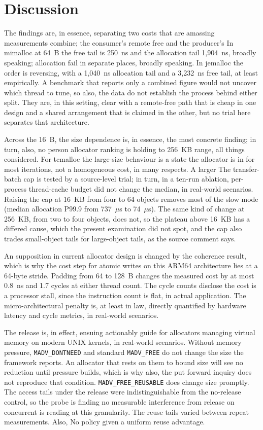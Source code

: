 \section{Discussion}
\label{sec:discussion}
The findings are, in essence, separating two costs that are amassing measurements combine; the consumer's remote free and the producer's
In mimalloc at 64~B the free tail is 250~ns and the allocation tail 1{,}904~ns, broadly speaking; allocation fail in separate places, broadly speaking.
In jemalloc the order is reversing, with a 1{,}040~ns allocation tail and a 3{,}232~ns free tail, at least empirically. A benchmark that reports
only a combined figure would not uncover which thread to tune, so also, the data do not establish the process behind either
split. They are, in this setting, clear with a remote-free path that is cheap in one design and a shared arrangement that is
claimed in the other, but no trial here separates that architecture.

Across the 16~B, the size dependence is, in essence, the most concrete finding; in turn, also, no person allocator ranking is holding to 256~KB range, all things considered.
For tcmalloc the large-size behaviour is a state the allocator is in for most iterations, not a homogeneous cost, in many respects. A larger
The transfer-batch cap is tested by a source-level trial; in turn, in a ten-run ablation, per-process thread-cache budget did not change the median, in real-world scenarios.
Raising the cap at 16~KB from four to 64 objects removes most of the slow mode (median allocation P99.9 from 737~$\mu$s to
74~$\mu$s). The same kind of change at 256~KB, from two to four objects, does not, so the plateau above 16~KB has a
differed cause, which the present examination did not spot, and the cap also trades small-object tails for large-object tails,
as the source comment says.

An supposition in current allocator design is changed by the coherence result, which is why the cost step for atomic writes on this ARM64 architecture
lies at a 64-byte stride. Padding from 64 to 128~B changes the measured cost by at most 0.8~ns and 1.7 cycles at either
thread count. The cycle counts disclose the cost is a processor stall, since the instruction count is flat, in actual application.
The micro-architectural penalty is, at least in law, directly quantified by hardware latency and cycle metrics, in real-world scenarios.

The release is, in effect, ensuing actionably guide for allocators managing virtual memory on modern UNIX kernels, in real-world scenarios. Without memory pressure,
\texttt{MADV\_DONTNEED} and standard \texttt{MADV\_FREE} do not change the size the framework reports. An allocator that rests
on them to bound size will see no reduction until pressure builds, which is why also, the put forward inquiry does not reproduce that
condition. \texttt{MADV\_FREE\_REUSABLE} does change size promptly. The access tails under the release were
indistinguishable from the no-release control, so the probe is finding no measurable interference from release on
concurrent is reading at this granularity. The reuse tails varied between repeat measurements. Also, No policy given a uniform reuse
advantage.

